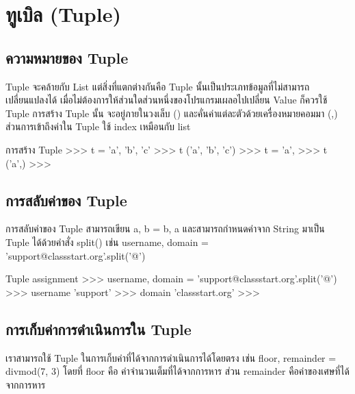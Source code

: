 \chapter{ทูเบิล (Tuple)}
\section{ความหมายของ Tuple}

Tuple จะคล้ายกับ List แต่สิ่งที่แตกต่างกันคือ Tuple นั้นเป็นประเภทข้อมูลที่ไม่สามารถเปลี่ยนแปลงได้ เมื่อไม่ต้องการให้ส่วนใดส่วนหนึ่งของโปรแกรมเผลอไปเปลี่ยน Value ก็ควรใช้ Tuple การสร้าง Tuple นั้น จะอยู่ภายในวงเล็บ () และคั่นค่าแต่ละตัวด้วยเครื่องหมายคอมมา (,) ส่วนการเข้าถึงค่าใน Tuple ใช้ index เหมือนกับ list

\begin{codelist}{การสร้าง Tuple}{}
>>> t = 'a', 'b', 'c'
>>> t
('a', 'b', 'c')
>>> t = 'a',
>>> t
('a',)
>>>
\end{codelist}



\section{การสลับค่าของ Tuple}

การสลับค่าของ Tuple สามารถเขียน a, b = b, a และสามารถกำหนดค่าจาก String มาเป็น Tuple ได้ด้วยคำสั่ง split() เช่น username, domain = 'support@classstart.org'.split('@')

\begin{codelist}{Tuple assignment}{}
>>> username, domain = 'support@classstart.org'.split('@')
>>> username
'support'
>>> domain
'classstart.org'
>>>
\end{codelist}


\section{การเก็บค่าการดำเนินการใน Tuple}

เราสามารถใช้ Tuple ในการเก็บค่าที่ได้จากการดำเนินการได้โดยตรง เช่น  floor, remainder = divmod(7, 3) โดยที่ floor คือ ค่าจำนวนเต็มที่ได้จากการหาร ส่วน remainder คือค่าของเศษที่ได้จากการหาร

